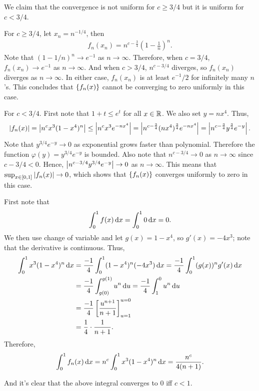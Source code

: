 \documentclass[12pt]{article}
\begin{document}
\begin{fproof}[2(b)]
    We claim that the convergence is not uniform for \(c \geq 3/4\) but it is uniform for \(c < 3/4\).

    For \(c \geq 3/4\), let \(x_n = n^{-1/4}\), then
    \begin{align*}
        f_n(x_n) = n^{c-\frac{3}{4}}\left(1 - \frac{1}{n}\right)^n.
    \end{align*}
    Note that \((1 - 1/n)^n \to e^{-1}\) as \(n \to \infty\).
    Therefore, when \(c = 3/4\), \(f_n(x_n) \to e^{-1}\) as \(n \to \infty\).
    And when \(c > 3/4\), \(n^{c-3/4}\) diverges, so \(f_n(x_n)\) diverges as \(n \to\infty\).
    In either case, \(f_n(x_n)\) is at least \(e^{-1}/2\) for infinitely many \(n\)'s. This concludes that \(\left\{ f_n(x) \right\}\) cannot be converging to zero uniformly in this case.

    For \(c < 3/4\). First note that \(1+t \leq e^t\) for all \(x \in \mathbb {R}\).
    We also set \(y = nx^4\). Thus,
    \begin{align*}
        \left\lvert f_n(x) \right\rvert = \left\lvert n^cx^3(1-x^4)^n \right\rvert \leq \left\lvert n^cx^3e^{-nx^4} \right\rvert = \left\lvert n^{c-\frac{3}{4}}(nx^4)^{\frac{3}{4}}e^{-nx^4} \right\rvert = \left\lvert n^{c-\frac{3}{4}}y^{\frac{3}{4}}e^{-y} \right\rvert.
    \end{align*}
    Note that \(y^{3/4}e^{-y} \to 0\) as exponential grows faster than polynomial. Therefore the function \(\varphi(y) =  y^{3/4}e^{-y}\) is bounded.
    Also note that \(n^{c-3/4} \to 0\) as \(n \to \infty\) since \(c-3/4 < 0\).
    Hence, \(\left\lvert n^{c-3/4}y^{3/4}e^{-y} \right\rvert \to 0\) as \(n \to \infty\).
    This means that \(\sup_{x\in [0,1]}\left\lvert f_n(x) \right\rvert \to 0\), which shows that \(\left\{ f_n(x) \right\}\) converges uniformly to zero in this case.
\end{fproof}

\begin{fproof}[2(c)]
    First note that \[\int_{0}^{1}f(x) \mathop{}\!\mathrm{d} x = \int_{0}^{1} 0 \mathop{}\!\mathrm{d} x = 0.\]
    We then use change of variable and let \(g(x) = 1-x^4\), so \(g'(x) = -4x^3\); note that the derivative is continuous.
    Thus,
    \begin{align*}
        \int_{0}^{1}x^3(1-x^4)^n \mathop{}\!\mathrm{d} x &= \frac{-1}{4}\int_{0}^{1}(1-x^4)^n(-4x^3) \mathop{}\!\mathrm{d} x = \frac{-1}{4} \int_{0}^{1} (g(x))^n g'(x) \mathop{}\!\mathrm{d} x \\
        &= \frac{-1}{4} \int_{g(0)}^{g(1)} u^n \mathop{}\!\mathrm{d} u = \frac{-1}{4}\int_{1}^{0} u^n \mathop{}\!\mathrm{d} u\\
        & = \frac{-1}{4} \left[ \frac{u^{n+1}}{n+1} \right]_{u=1}^{u=0}\\
        &= \frac{1}{4} \cdot \frac{1}{n+1}.
    \end{align*}
    Therefore, 
    \begin{align*}
        \int_{0}^{1} f_n(x) \mathop{}\!\mathrm{d} x = n^c \int_{0}^{1}x^3(1-x^4)^n \mathop{}\!\mathrm{d} x = \frac{n^c}{4(n+1)}.
    \end{align*}
    
    And it's clear that the above integral converges to \(0\) iff \(c < 1\).
\end{fproof}
\newpage
\end{document}
